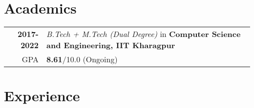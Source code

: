 \documentclass[a4paper,10pt]{extarticle} %
\begin{document}
\vspace{-0.4cm}
\section{\textcolor{primary}{Academics}}

\begin{tabular}{r|p{17.5cm}}	
\textbf{2017-2022} & \textit{B.Tech + M.Tech (Dual Degree)} in \textbf{Computer Science and Engineering, IIT Kharagpur}\\
\hfill GPA & \textbf{8.61}/10.0 (Ongoing)\\
\end{tabular}

\vspace{-0.3cm}
\section{\textcolor{primary}{Experience}}
\end{document}
